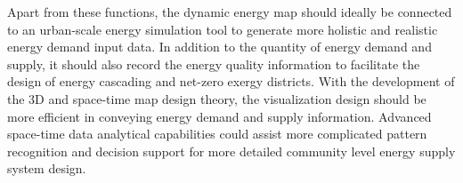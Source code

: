 Apart from these functions, the dynamic energy map should ideally be
connected to an urban-scale energy simulation tool to generate more
holistic and realistic energy demand input data. In addition to the
quantity of energy demand and supply, it should also record the energy
quality information to facilitate the design of energy cascading and
net-zero exergy districts. With the development of the 3D and
space-time map design theory, the visualization design should be more
efficient in conveying energy demand and supply information. Advanced
space-time data analytical capabilities could assist more complicated
pattern recognition and decision support for more detailed community
level energy supply system design.